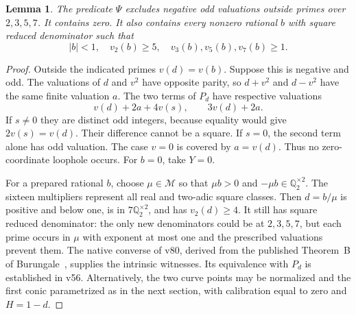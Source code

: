 \documentclass[11pt,a4paper]{article}
\newtheorem{lemma}[theorem]{Lemma}
\newcommand{\Q}{\mathbb Q}\newcommand{\Z}{\mathbb Z}
\begin{document}
\begin{lemma}\label{lem:prepared}
The predicate $\Psi$ excludes negative odd valuations outside primes
over $2,3,5,7$. It contains zero. It also contains every nonzero rational
$b$ with square reduced denominator such that
\[
 |b|<1,\quad v_2(b)\ge5,\quad
                v_3(b),v_5(b),v_7(b)\ge1.
\]
\end{lemma}
\begin{proof}
Outside the indicated primes $v(d)=v(b)$. Suppose this is negative
and odd. The valuations of $d$ and $v^2$ have opposite parity, so
$d+v^2$ and $d-v^2$ have the same finite valuation $a$.
The two terms of $P_d$ have respective valuations
\[
 v(d)+2a+4v(s),\qquad3v(d)+2a.
\]
If $s\ne0$ they are distinct odd integers, because equality would
give $2v(s)=v(d)$. Their difference cannot be a square. If $s=0$,
the second term alone has odd valuation. The case $v=0$ is covered
by $a=v(d)$. Thus no zero-coordinate loophole occurs. For $b=0$,
take $Y=0$.

For a prepared rational $b$, choose $\mu\in\mathcal M$ so that
$\mu b>0$ and $-\mu b\in\Q_2^{\times2}$. The sixteen multipliers
represent all real and two-adic square classes. Then $d=b/\mu$ is
positive and below one, is in $7\Q_2^{\times2}$, and has
$v_2(d)\ge4$. It still has square reduced denominator: the only
new denominators could be at $2,3,5,7$, but each prime occurs in $\mu$
with exponent at most one and the prescribed valuations prevent them.
The native converse of v80, derived from the published Theorem~B of
Burungale~\cite{Burungale,v80}, supplies the intrinsic witnesses.
Its equivalence with $P_d$ is established in v56. Alternatively, the
two curve points may be normalized and the first conic parametrized
as in the next section, with calibration equal to zero and $H=1-d$.
\end{proof}
\end{document}
